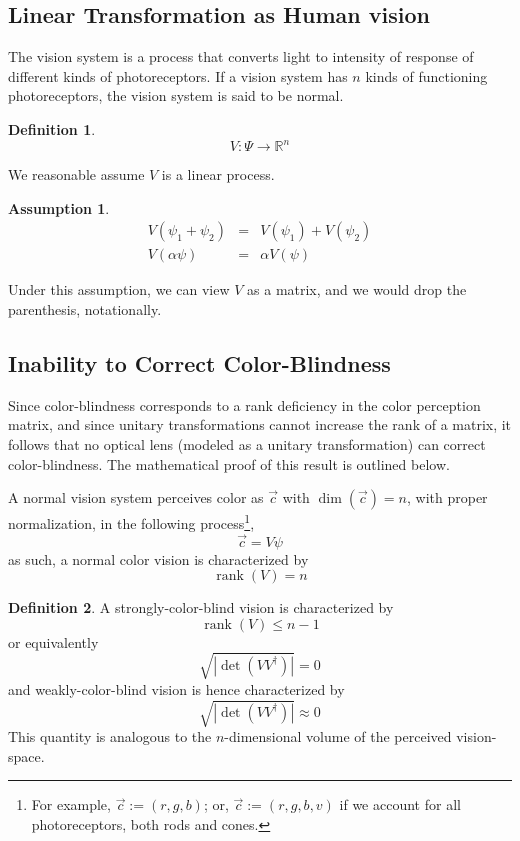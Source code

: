 \documentclass[10pt,a4paper]{article}
\newtheorem{ass}{Assumption}[section]
\theoremstyle{definition}
\newtheorem{defn}{Definition}[section]
\theoremstyle{remark}
\numberwithin{equation}{section}
\DeclareMathOperator{\rank}{rank}
\newcommand{\abs}[1]{\left\vert#1\right\vert}
\newcommand{\Real}{\mathbb R}
\newcommand{\pdet}[1]{            \sqrt{\abs{   \det    \left(#1 #1^\dagger \right)   }}               }
\begin{document}
\subsection{Linear Transformation as Human vision}
The vision system is a process that converts light to intensity of response of different kinds of photoreceptors. If a vision system has $n$ kinds of functioning photoreceptors, the vision system is said to be normal. 
\begin{defn}
\begin{equation}
V:\Psi \rightarrow \Real^n
\end{equation}
\end{defn}
We reasonable assume $V$ is a linear process.
\begin{ass}
\begin{eqnarray}
V(\psi_1+\psi_2)&=&V(\psi_1)+V(\psi_2)\\
V(\alpha \psi)&=&\alpha V(\psi)
\end{eqnarray}
\end{ass}
Under this assumption, we can view $V$ as a matrix, and we would drop the parenthesis, notationally.


\subsection{Inability to Correct Color-Blindness}
Since color-blindness corresponds to a rank deficiency in the color perception matrix, and since unitary transformations cannot increase the rank of a matrix, it follows that no optical lens (modeled as a unitary transformation) can correct color-blindness. The mathematical proof of this result is outlined below.

A normal vision system perceives color as $\vec{c}$ with $\dim(\vec{c})=n$, with proper normalization, in the following process\footnote{For example, $\vec{c}:= (r,g,b)$; or, $\vec{c}:= (r,g,b,v)$ if we account for all photoreceptors, both rods and cones.}, 
\begin{equation}
\vec{c} = V \psi 
\end{equation}
as such, a normal color vision is characterized by 
\begin{equation}
\rank(V)=n
\end{equation}


\begin{defn}
A strongly-color-blind vision is characterized by 
\begin{equation}
\rank(V)\leq n-1
\end{equation}
or equivalently
\begin{equation}
\pdet{V}= 0
\end{equation}
and weakly-color-blind vision is hence characterized by 
\begin{equation}
\pdet{V}\approx 0
\end{equation}
This quantity is analogous to the  $n$-dimensional volume of the perceived vision-space.
\end{defn}
\end{document}
